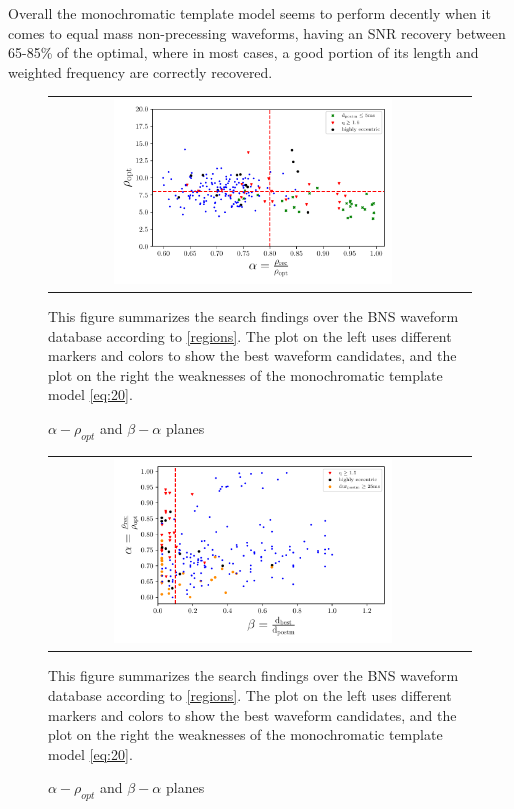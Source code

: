 Overall the monochromatic template model seems to perform decently when it comes to equal mass non-precessing waveforms, having an SNR recovery between 65-85\% of the optimal, where in most cases, a good portion of its length and weighted frequency are correctly recovered.

\begin{figure}[hbt!]
\begin{center}
\begin{tabular}{cc}
\includegraphics[width=0.7\textwidth, angle=0]{images/Data_analysis/results/alpha_sum0.pdf}
\end{tabular}
\end{center}
\caption{$\alpha - \rho_{opt}$ and $\beta - \alpha$  planes}
This figure summarizes the search findings over the BNS waveform database according to \ref{regions}. The plot on the left uses different markers and colors to show the best waveform candidates, and the plot on the right the weaknesses of the monochromatic template model \ref{eq:20}.
\end{figure}

\begin{figure}[hbt!]
\begin{center}
\begin{tabular}{cc}
\includegraphics[width=0.7\textwidth, angle=0]{images/Data_analysis/results/alpha_sum1.pdf}
\end{tabular}
\end{center}
\caption{$\alpha - \rho_{opt}$ and $\beta - \alpha$  planes}
This figure summarizes the search findings over the BNS waveform database according to \ref{regions}. The plot on the left uses different markers and colors to show the best waveform candidates, and the plot on the right the weaknesses of the monochromatic template model \ref{eq:20}.
\end{figure}
\FloatBarrier


